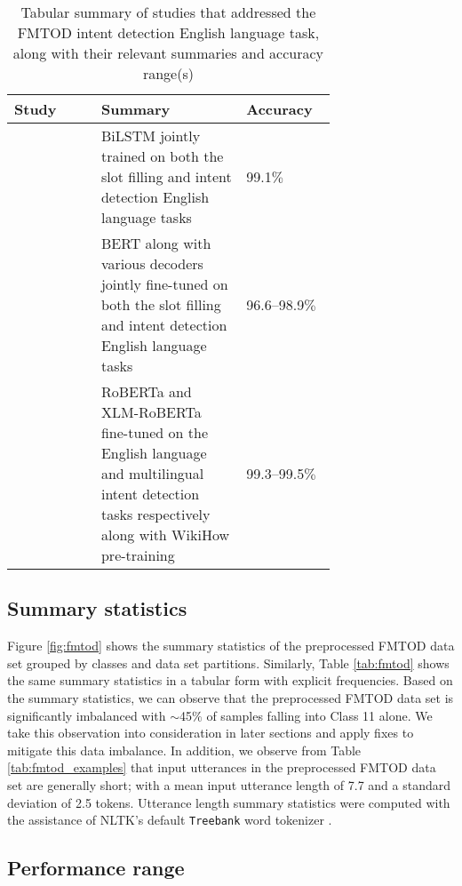 \begin{table}[t!]
  \centering {}
  \begin{tabular}{L{0.27\linewidth} L{0.45\linewidth} l}
    \toprule
    Study & Summary & Accuracy \\
    \midrule
    \citet{schuster-etal-2019-cross-lingual} & BiLSTM jointly trained on both the slot filling and intent detection English language tasks & 99.1$\%$ \\
    \citet{zhang2019joint} & BERT along with various decoders jointly fine-tuned on both the slot filling and intent detection English language tasks & 96.6--98.9$\%$ \\
    \citet{zhang-etal-2020-intent} & RoBERTa and XLM-RoBERTa fine-tuned on the English language and multilingual intent detection tasks respectively along with WikiHow pre-training & 99.3--99.5$\%$ \\
    \bottomrule
  \end{tabular}
  \caption{Tabular summary of studies that addressed the FMTOD intent detection
    English language task, along with their relevant summaries and accuracy
    range(s)}
  \label{tab:fmtod_results}
\end{table}

\subsection{Summary statistics}

\label{section:fmtod_summary}

Figure \ref{fig:fmtod} shows the summary statistics of the preprocessed FMTOD
data set grouped by classes and data set partitions. Similarly, Table
\ref{tab:fmtod} shows the same summary statistics in a tabular form with
explicit frequencies. Based on the summary statistics, we can observe that the
preprocessed FMTOD data set is significantly imbalanced with $\sim$45$\%$ of
samples falling into Class 11 alone. We take this observation into consideration
in later sections and apply fixes to mitigate this data imbalance. In addition,
we observe from Table \ref{tab:fmtod_examples} that input utterances in the
preprocessed FMTOD data set are generally short; with a mean input utterance
length of 7.7 and a standard deviation of 2.5 tokens. Utterance length summary
statistics were computed with the assistance of NLTK's default \texttt{Treebank}
word tokenizer \citep{bird-loper-2004-nltk}.

\subsection{Performance range}

